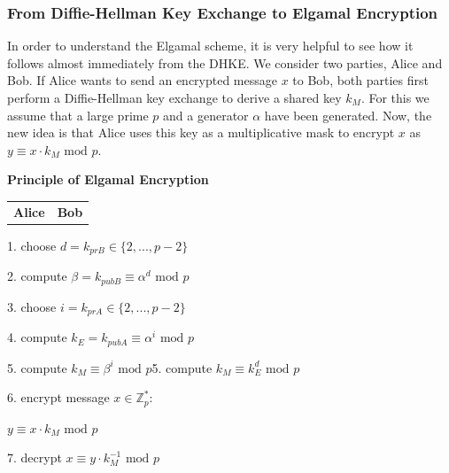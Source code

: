 \documentclass[11pt, a4paper]{article}
\newcommand{\mymod}{
    \text{ mod }
}
\begin{document}
\subsubsection{From Diffie-Hellman Key Exchange to Elgamal Encryption}
In order to understand the Elgamal scheme, it is very helpful to see how it follows almost immediately from the DHKE. We consider two parties, Alice and Bob. If Alice wants to send an encrypted message $x$ to Bob, both parties first perform a Diffie-Hellman key exchange to derive a shared key $k_M$. For this we assume that a large prime $p$ and a generator $\alpha$ have been generated. Now, the new idea is that Alice uses this key as a multiplicative mask to encrypt $x$ as $y\equiv x\cdot k_M\mymod p$.
\begin{framed}
    \begin{center}
        \textbf{Principle of Elgamal Encryption}\vspace{0.25cm}
        \begin{tabular}{c@{\hskip 10cm}c}
            \textbf{Alice}&\textbf{Bob}
        \end{tabular}
    \end{center}
    
    {\hskip 10.5cm}1. choose $d=k_{prB}\in\{2,...,p-2\}$
    
    {\hskip 10.5cm}2. compute $\beta=k_{pubB}\equiv\alpha^d\mymod p$

    \begin{center}\end{center}
    
    3. choose $i=k_{prA}\in\{2,...,p-2\}$
    
    4. compute $k_E=k_{pubA}\equiv\alpha^i\mymod p$
    
    \begin{center}\end{center}
    
    5. compute $k_M\equiv\beta^i\mymod p${\hskip 5.9cm}5. compute $k_M\equiv k_E^d\mymod p$
    
    6. encrypt message $x\in\mathbb{Z}_p^*$:\vspace{0.1cm}
    
    {\hskip 0.9cm}$y\equiv x\cdot k_M\mymod p$

    \begin{center}\end{center}
    
    {\hskip 10.55cm}7. decrypt $x\equiv y\cdot k_M^{-1}\mymod p$
    
\end{framed}
\end{document}
